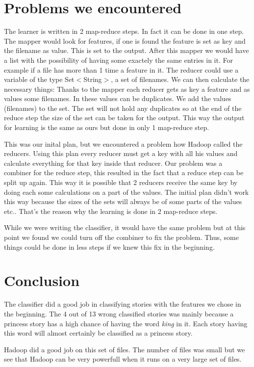 \documentclass{article}
\begin{document}
\section{Problems we encountered}
The learner is written in 2 map-reduce steps. In fact it can be done in one step. 
The mapper would look for features, if one is found the feature is set as key and the filename as value. 
This is set to the output. After this mapper we would have a list with the possibility of having some 
exactely the same entries in it. For example if a file has more than 1 time a feature in it. 
The reducer could use a variable of the type Set$<$String$>$, a set of filenames. 
We can then calculate the necessary things:
Thanks to the mapper each reducer gets as key a feature and as values some filenames. 
In these values can be duplicates. We add the values (filenames) to the set. 
The set will not hold any duplicates so at the end of the reduce step the size of the set can be taken for the output. This way the output for learning is the same as ours but done in only 1 map-reduce step.
\par
This was our inital plan, but we encountered a problem how Hadoop called the reducers. Using this plan every reducer must get a key with all his values and calculate everything for that key inside that reducer.
Our problem was a combiner for the reduce step, this resulted in the fact that a reduce step can be split up again. This way it is possible that 2 reducers receive the same key by doing each some calculations on a part of the values. The initial plan didn't work this way because the sizes of the sets will always be of some parts of the values etc..
That's the reason why the learning is done in 2 map-reduce steps. 
\par
While we were writing the classifier, it would have the same problem but at this point we found we could turn off the combiner to fix the problem.
Thus, some things could be done in less steps if we knew this fix in the beginning.
\section{Conclusion}
The classifier did a good job in classifying stories with the features we chose in the beginning.  The 4 out of 13 wrong classified stories was mainly because a princess story has a high chance of having the word \textit{king} in it. Each story having this word will almost certainly be classified as a princess story.
\par
Hadoop did a good job on this set of files. The number of files was small but we see that Hadoop can be very powerfull when it runs on a very large set of files.
\end{document}
